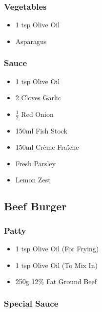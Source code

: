 \documentclass[11pt, english]{article}
\begin{document}
		\subsubsection*{Vegetables}

	\begin{itemize}
        \setlength\itemsep{0cm}
                \item 1 tsp Olive Oil
		\item Asparagus
        \end{itemize}
	
		\subsubsection*{Sauce}

	\begin{itemize}
        \setlength\itemsep{0cm}
                \item 1 tsp Olive Oil
		\item 2 Cloves Garlic
		\item $\frac{1}{2}$ Red Onion
		\item 150ml Fish Stock
		\item 150ml Cr\`{e}me Fra\^{i}che
		\item Fresh Parsley
		\item Lemon Zest
        \end{itemize}

\newpage

	\subsection{Beef Burger}

		\subsubsection*{Patty}

	\begin{itemize}
        \setlength\itemsep{0cm}
		\item 1 tsp Olive Oil (For Frying)
		\item 1 tsp Olive Oil (To Mix In)
		\item 250g 12\% Fat Ground Beef
        \end{itemize}

		\subsubsection*{Special Sauce}
\end{document}

